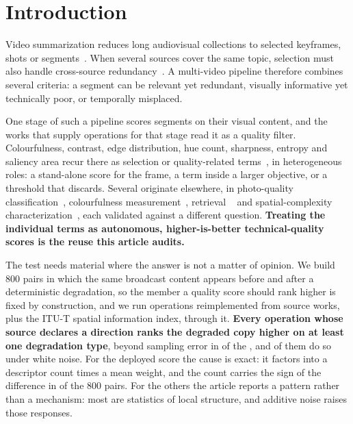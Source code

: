 \section{Introduction}\label{sec:intro}

Video summarization reduces long audiovisual collections to selected keyframes,
shots or segments~\citep{truong2007video_abstraction,apostolidis2021survey}.
When several sources cover the same topic, selection must also handle
cross-source redundancy~\citep{li2010videommr,panda2017collaborative,
wu2020mvsgcn}. A multi-video pipeline therefore combines several criteria: a
segment can be relevant yet redundant, visually informative yet technically
poor, or temporally misplaced.

One stage of such a pipeline scores segments on their visual content, and the works that
supply operations for that stage read it as a quality filter. Colourfulness, contrast, edge distribution, hue count,
sharpness, entropy and saliency area recur there as selection or quality-related
terms~\citep{srinivas2016rank,jeong2016static,qaroush2025diversity,cakmak2025tripss,
huang2024aesthetic,korolkov2025keyframe}, in heterogeneous roles: a stand-alone score for
the frame, a term inside a larger objective, or a threshold that discards. Several
originate elsewhere, in photo-quality classification~\citep{ke2006highlevel},
colourfulness measurement~\citep{hasler2003colorfulness}, retrieval
~\citep{sivic2003videogoogle,csurka2004bovw} and spatial-complexity
characterization~\citep{itu_p910}, each validated against a different question.
\textbf{Treating the individual terms as autonomous, higher-is-better technical-quality
scores is the reuse this article audits.}

The test needs material where the answer is not a matter of opinion. We build 800 pairs
in which the same broadcast content appears before and after a deterministic degradation,
so the member a quality score should rank higher is fixed by construction, and we run \fontesDaLiteratura{} operations reimplemented from \fontesTrabalhos{} source
works, plus the ITU-T spatial information index, through it. \textbf{Every operation whose source declares a direction ranks the degraded copy higher
on at least one degradation type}, beyond sampling error in \invOpsSig{} of the
\fontesDaLiteratura{}, and \resRuido{} of them do so under white noise. For the deployed score the cause is exact: it factors into a descriptor count times a mean
weight, and the count carries the sign of the difference in \mecConcordam{} of the 800 pairs. For the others the article reports a pattern rather than a mechanism: most are statistics of local structure, and additive noise raises those responses.

